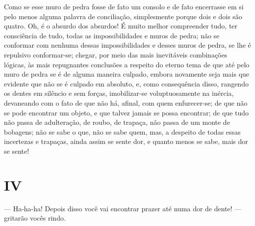 Como se esse muro de pedra fosse de fato um consolo e de fato encerrasse
em si pelo menos alguma palavra de conciliação, simplesmente porque
dois e dois são quatro. Oh, é o absurdo dos absurdos! É muito melhor
compreender tudo, ter consciência de tudo, todas as impossibilidades e
muros de pedra; não se conformar com nenhuma dessas impossibilidades e
desses muros de pedra, se lhe é repulsivo conformar-se; chegar, por
meio das mais inevitáveis combinações lógicas, às mais repugnantes
conclusões a respeito do eterno tema de que até pelo muro de pedra se é
de alguma maneira culpado, embora novamente seja mais que evidente que
não se é culpado em absoluto, e, como consequência disso, rangendo os
dentes em silêncio e sem forças, imobilizar-se voluptuosamente na
inércia, devaneando com o fato de que não há, afinal, com quem
enfurecer-se; de que não se pode encontrar um objeto, e que talvez
jamais se possa encontrar; de que tudo não passa de adulteração, de
roubo, de trapaça, não passa de um monte de bobagens; não se sabe o
que, não se sabe quem, mas, a despeito de todas essas incertezas e
trapaças, ainda assim se sente dor, e quanto menos se sabe, mais dor se
sente!


\section{IV}

--- Ha-ha-ha! Depois disso você vai encontrar prazer até numa dor de
dente! --- gritarão vocês rindo.

